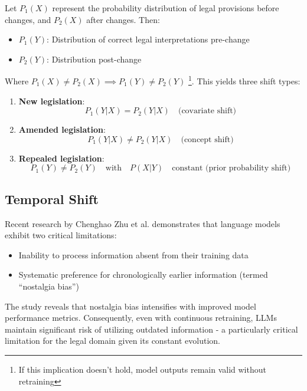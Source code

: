 Let $P_1(X)$ represent the probability distribution of legal provisions before changes, 
and $P_2(X)$ after changes. Then:
\begin{itemize}
    \item $P_1(Y)$: Distribution of correct legal interpretations pre-change
    \item $P_2(Y)$: Distribution post-change
\end{itemize}

Where $P_1(X) \neq P_2(X) \implies P_1(Y) \neq P_2(Y)$
\footnote{If this implication doesn't hold, model outputs remain valid without retraining}. 
This yields three shift types:
\begin{enumerate}
    \item \textbf{New legislation}: 
    \begin{equation*}
        P_1(Y|X) = P_2(Y|X) \quad \text{(covariate shift)}
    \end{equation*}
    
    \item \textbf{Amended legislation}:
    \begin{equation*}
        P_1(Y|X) \neq P_2(Y|X) \quad \text{(concept shift)}
    \end{equation*}
    
    \item \textbf{Repealed legislation}:
    \begin{equation*}
        P_1(Y) \neq P_2(Y) \quad \text{with} \quad P(X|Y) \quad \text{constant (prior probability shift)}
    \end{equation*}
\end{enumerate}

\subsection{Temporal Shift}

Recent research by Chenghao Zhu et al. \cite{chenghaozhuYourLLMOutdated2025} demonstrates that 
language models exhibit two critical limitations:
\begin{itemize}
    \item Inability to process information absent from their training data
    \item Systematic preference for chronologically earlier information (termed ``nostalgia bias'')
\end{itemize}

The study reveals that nostalgia bias intensifies with improved model performance metrics. 
Consequently, even with continuous retraining, LLMs maintain significant 
risk of utilizing outdated information - 
a particularly critical limitation for the legal domain given its constant evolution.


